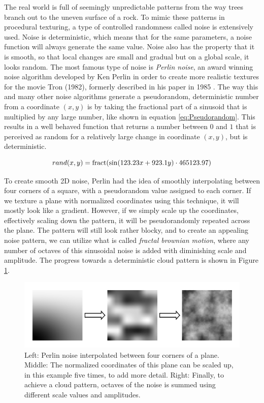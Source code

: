The real world is full of seemingly unpredictable patterns from the way trees branch out to the uneven surface of a rock. To mimic these patterns in procedural texturing, a type of controlled randomness called noise is extensively used. Noise is deterministic, which means that for the same parameters, a noise function will always generate the same value. Noise also has the property that it is smooth, so that local changes are small and gradual but on a global scale, it looks random. The most famous type of noise is \textit{Perlin noise}, an award winning noise algorithm developed by Ken Perlin in order to create more realistic textures for the movie Tron (1982), formerly described in his paper in 1985 \cite{perlin_1985_an}. The way this and many other noise algorithms generate a pseudorandom, deterministic number from a coordinate $(x,y)$ is by taking the fractional part of a sinusoid that is multiplied by any large number, like shown in equation \ref{eq:Pseudorandom}. This results in a well behaved function that returns a number between $0$ and $1$ that is perceived as random for a relatively large change in coordinate $(x,y)$, but is deterministic. 

\begin{equation}
    rand(x,y) = \operatorname{fract}(\sin(123.23x + 923.1y) \cdot 465123.97)
    \label{eq:Pseudorandom}
\end{equation}

To create smooth 2D noise, Perlin had the idea of smoothly interpolating between four corners of a square, with a pseudorandom value assigned to each corner. If we texture a plane with normalized coordinates using this technique, it will mostly look like a gradient. However, if we simply scale up the coordinates, effectively scaling down the pattern, it will be pseudorandomly repeated across the plane. The pattern will still look rather blocky, and to create an appealing noise pattern, we can utilize what is called \textit{fractal brownian motion}, where any number of octaves of this sinusoidal noise is added with diminishing scale and amplitude. The progress towards a deterministic cloud pattern is shown in Figure \ref{fig:ProceduralNoise}. 

\begin{figure}[!h]
    \centering
    \includegraphics[width=1.0\textwidth]{img/background/Procedural Noise.pdf}
    \caption{Left: Perlin noise interpolated between four corners of a plane. Middle: The normalized coordinates of this plane can be scaled up, in this example five times, to add more detail. Right: Finally, to achieve a cloud pattern, octaves of the noise is summed using different scale values and amplitudes.}
    \label{fig:ProceduralNoise}
\end{figure}

